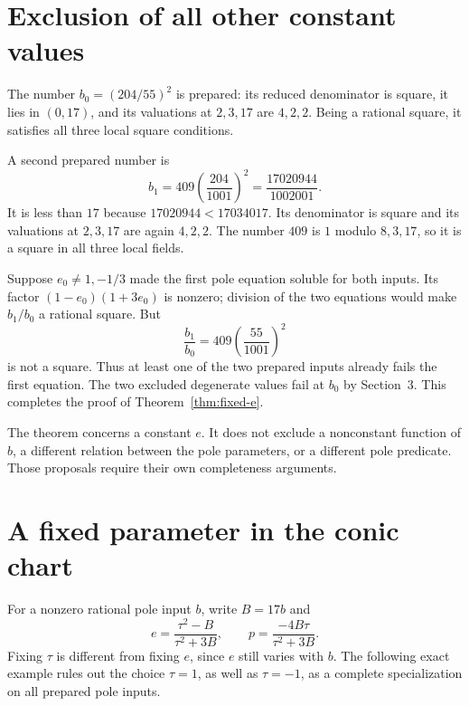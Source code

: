 \documentclass[11pt,a4paper]{article}
\theoremstyle{definition}\newtheorem{definition}[theorem]{Definition}
\begin{document}
\section{Exclusion of all other constant values}

The number $b_0=(204/55)^2$ is prepared: its reduced denominator
is square, it lies in $(0,17)$, and its valuations at $2,3,17$
are $4,2,2$.  Being a rational square, it satisfies all three
local square conditions.

A second prepared number is
\[
 b_1=409\left(\frac{204}{1001}\right)^2
       =\frac{17020944}{1002001}.
\]
It is less than $17$ because $17020944<17034017$.
Its denominator is square and its valuations at $2,3,17$ are
again $4,2,2$.  The number $409$ is $1$ modulo $8,3,17$,
so it is a square in all three local fields.

Suppose $e_0\ne1,-1/3$ made the first pole equation soluble
for both inputs.  Its factor $(1-e_0)(1+3e_0)$ is nonzero;
division of the two equations would make $b_1/b_0$ a rational
square.  But
\[
                     \frac{b_1}{b_0}=409\left(\frac{55}{1001}\right)^2
\]
is not a square.  Thus at least one of the two prepared inputs
already fails the first equation.  The two excluded degenerate
values fail at $b_0$ by Section~3.  This completes the proof of
Theorem~\ref{thm:fixed-e}.

The theorem concerns a constant $e$.  It does not exclude a
nonconstant function of $b$, a different relation between the pole
parameters, or a different pole predicate.  Those proposals require
their own completeness arguments.

\section{A fixed parameter in the conic chart}

For a nonzero rational pole input $b$, write $B=17b$ and
\[
 e=\frac{\tau^2-B}{\tau^2+3B},\qquad
 p=\frac{-4B\tau}{\tau^2+3B}.
\]
Fixing $\tau$ is different from fixing $e$, since $e$ still varies with $b$.
The following exact example rules out the choice $\tau=1$, as well as
$\tau=-1$, as a complete specialization on all prepared pole inputs.
\end{document}

